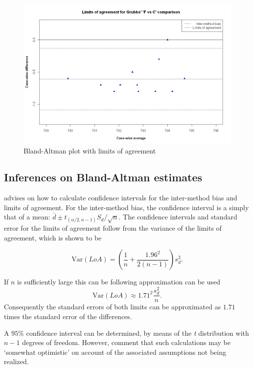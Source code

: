 \documentclass[Main.tex]{subfiles}
\begin{document}
\begin{figure}[h!]
	\begin{center}
		\includegraphics[width=125mm]{images/GrubbsBAplot-LOA.jpeg}
		\caption{Bland-Altman plot with limits of agreement}\label{GrubbsBAplot-noLOA}
	\end{center}
\end{figure}


\subsection{Inferences on Bland-Altman estimates}
\citet*{BA99} advises on how to calculate confidence intervals for the inter-method bias and limits of agreement.
For the inter-method bias, the confidence interval is a simply that of a mean: $\bar{d} \pm t_{(\alpha/2,n-1)} S_{d}/\sqrt{n}$.
The confidence
intervals and standard error for the limits of agreement follow from the variance of the limits of agreement, which is shown to be

\[
\mbox{Var}(LoA) = (\frac{1}{n}+\frac{1.96^{2}}{2(n-1)})s_{d}^{2}.
\]

If $n$ is sufficiently large this can be following approximation
can be used
\[
\mbox{Var}(LoA) \approx 1.71^{2}\frac{s_{d}^{2}}{n}.
\]
Consequently the standard errors of both limits can be
approximated as $1.71$ times the standard error of the
differences.

A $95\%$ confidence interval can be determined, by means of the
\emph{t} distribution with $n-1$ degrees of freedom. However, \citet*{BA99} comment that such calculations  may be `somewhat optimistic' on account of the associated assumptions not being realized.
\end{document}
